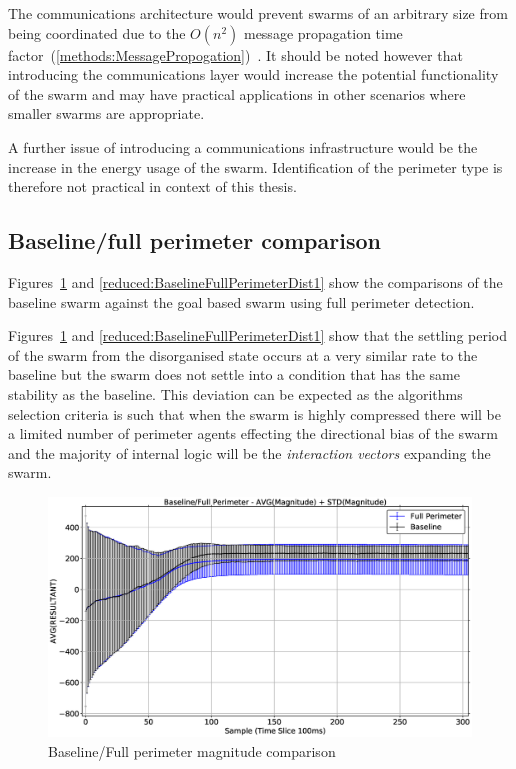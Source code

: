 The communications architecture would prevent swarms of an arbitrary size from being coordinated due to the $O(n^{2})$ message propagation time factor~(\autoref{methods:MessagePropogation})~\cite{SHA:07}. It should be noted however that introducing the communications layer would increase the potential functionality of the swarm and may have practical applications in other scenarios where smaller swarms are appropriate. 

A further issue of introducing a communications infrastructure would be the increase in the energy usage of the swarm. Identification of the perimeter type is therefore not practical in context of this thesis.

\subsection{Baseline/full perimeter comparison\label{section:compareBaselineFullPerimeter}}
Figures~\ref{reduced:BaselineFullPerimeterMag1} and \ref{reduced:BaselineFullPerimeterDist1} show the comparisons of the baseline swarm against the goal based swarm using full perimeter detection. 

Figures~\ref{reduced:BaselineFullPerimeterMag1} and \ref{reduced:BaselineFullPerimeterDist1} show that the settling period of the swarm from the disorganised state occurs at a very similar rate to the baseline but the swarm does not settle into a condition that has the same stability as the baseline. This deviation can be expected as the algorithms selection criteria is such that when the swarm is highly compressed there will be a limited number of perimeter agents effecting the directional bias of the swarm and the majority of internal logic will be the \textit{interaction vectors} expanding the swarm.

\begin{figure}[H]
\begin{center}
\includegraphics[width=14cm]{CHAPTER-6/figures/BaselineFullPerimeterMag1}
\end{center}
\caption{Baseline/Full perimeter magnitude comparison\label{reduced:BaselineFullPerimeterMag1}}
\end{figure}

